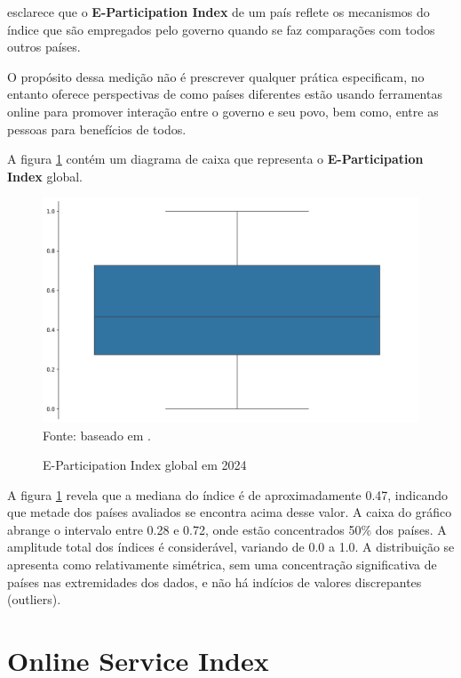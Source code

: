 \cite{ONU_EGDI} esclarece que o \textbf{E-Participation Index} de um país reflete os mecanismos do índice que são empregados pelo governo quando se faz comparações com todos outros países. 

O propósito dessa medição não é prescrever qualquer prática especificam, no entanto oferece perspectivas de como países diferentes estão usando ferramentas online para promover interação entre o governo e seu povo, bem como, entre as pessoas para benefícios de todos.

A figura \ref{fig:boxplot_epart_global} contém um diagrama de caixa que representa o \textbf{E-Participation Index} global.

\begin{figure}[H]
	\centering
	\caption{E-Participation Index global em 2024}
	\includegraphics[width=1\linewidth]{figuras/egdi/boxplot_epart_global.png}
	\label{fig:boxplot_epart_global}
	\footnotesize{Fonte: baseado em \cite{ONU_EGDI_mapa}.}
\end{figure}

A figura \ref{fig:boxplot_epart_global} revela que a mediana do índice é de aproximadamente 0.47, indicando que metade dos países avaliados se encontra acima desse valor. A caixa do gráfico abrange o intervalo entre 0.28 e 0.72, onde estão concentrados 50\% dos países. A amplitude total dos índices é considerável, variando de 0.0 a 1.0. A distribuição se apresenta como relativamente simétrica, sem uma concentração significativa de países nas extremidades dos dados, e não há indícios de valores discrepantes (outliers).

\section{Online Service Index}
\label{osi}

